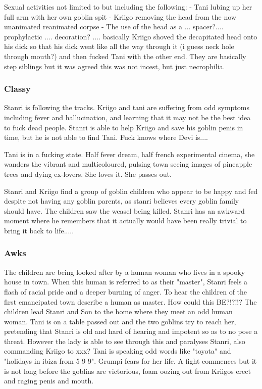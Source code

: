 Sexual activities not limited to but including the following: - Tani lubing up her full arm with her own goblin spit - Kriigo removing the head from the now unanimated reanimated corpse - The use of the head as a ... spacer?.... prophylactic .... decoration? .... basically Kriigo shoved the decapitated head onto his dick so that his dick went like all the way through it (i guess neck hole through mouth?) and then fucked Tani with the other end. They are basically step siblings but it was agreed this was not incest, but just necrophilia.\medskip

\subsubsection{Classy}
Stanri is following the tracks. Kriigo and tani are suffering from odd symptoms including fever and hallucination, and learning that it may not be the best idea to fuck dead people. Stanri is able to help Kriigo and save his goblin penis in time, but he is not able to find Tani. Fuck knows where Devi is....\medskip

Tani is in a fucking state. Half fever dream, half french experimental cinema, she wanders the vibrant and multicoloured, pulsing town seeing images of pineapple trees and dying ex-lovers. She loves it. She passes out.\medskip

Stanri and Kriigo find a group of goblin children who appear to be happy and fed despite not having any goblin parents, as stanri believes every goblin family should have. The children saw the weasel being killed. Stanri has an awkward moment where he remembers that it actually would have been really trivial to bring it back to life.....\medskip

\subsubsection{Awks}
The children are being looked after by a human woman who lives in a spooky house in town. When this human is referred to as their "master", Stanri feels a flash of racial pride and a deeper burning of anger. To hear the children of the first emancipated town describe a human as master. How could this BE?!?!!? The children lead Stanri and Son to the home where they meet an odd human woman. Tani is on a table passed out and the two goblins try to reach her, pretending that Stanri is old and hard of hearing and impotent so as to no pose a threat. However the lady is able to see through this and paralyses Stanri, also commanding Kriigo to xxx? Tani is speaking odd words like "toyota" and "holidays in ibiza from 5 9 9". Grumpi fears for her life. A fight commences but it is not long before the goblins are victorious, foam oozing out from Kriigos erect and raging penis and mouth.\medskip

